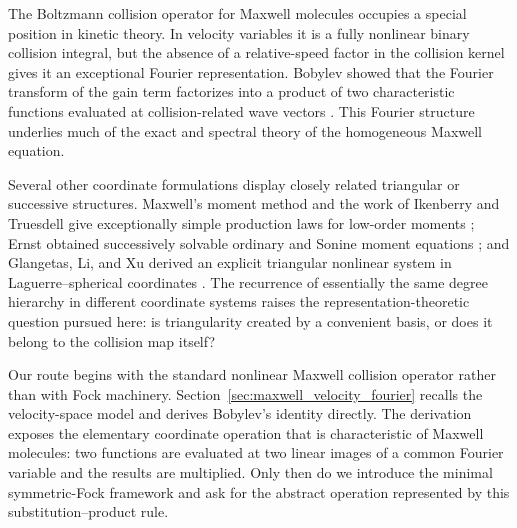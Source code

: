 \documentclass[11pt,oneside]{article}
\numberwithin{equation}{section}
\theoremstyle{definition}
\begin{document}
The Boltzmann collision operator for Maxwell molecules occupies a special position in kinetic theory.  In velocity variables it is a fully nonlinear binary collision integral, but the absence of a relative-speed factor in the collision kernel gives it an exceptional Fourier representation.  Bobylev showed that the Fourier transform of the gain term factorizes into a product of two characteristic functions evaluated at collision-related wave vectors \cite{Bobylev1975Fourier,Bobylev1988MaxwellReview}.  This Fourier structure underlies much of the exact and spectral theory of the homogeneous Maxwell equation.

Several other coordinate formulations display closely related triangular or successive structures.  Maxwell's moment method and the work of Ikenberry and Truesdell give exceptionally simple production laws for low-order moments \cite{Maxwell1867DynamicalTheory,IkenberryTruesdell1956I,Truesdell1956II,TruesdellMuncaster1980Maxwell}; Ernst obtained successively solvable ordinary and Sonine moment equations \cite{Ernst1979MaxwellMoments}; and Glangetas, Li, and Xu derived an explicit triangular nonlinear system in Laguerre--spherical coordinates \cite{GlangetasLiXu2016Triangular}.  The recurrence of essentially the same degree hierarchy in different coordinate systems raises the representation-theoretic question pursued here: is triangularity created by a convenient basis, or does it belong to the collision map itself?

Our route begins with the standard nonlinear Maxwell collision operator rather than with Fock machinery.  Section~\ref{sec:maxwell_velocity_fourier} recalls the velocity-space model and derives Bobylev's identity directly.  The derivation exposes the elementary coordinate operation that is characteristic of Maxwell molecules: two functions are evaluated at two linear images of a common Fourier variable and the results are multiplied.  Only then do we introduce the minimal symmetric-Fock framework and ask for the abstract operation represented by this substitution--product rule.
\end{document}
